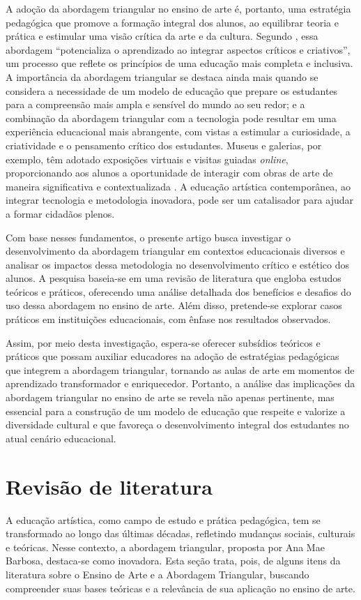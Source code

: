 \documentclass[portuguese]{textolivre}
\begin{document}
A adoção da abordagem triangular no ensino de arte é, portanto, uma estratégia pedagógica que promove a formação integral dos alunos, ao equilibrar teoria e prática e estimular uma visão crítica da arte e da cultura. Segundo \textcite{lopes2013metodologias}, essa abordagem “potencializa o aprendizado ao integrar aspectos críticos e criativos”, um processo que reflete os princípios de uma educação mais completa e inclusiva. A importância da abordagem triangular se destaca ainda mais quando se considera a necessidade de um modelo de educação que prepare os estudantes para a compreensão mais ampla e sensível do mundo ao seu redor; e a combinação da abordagem triangular com a tecnologia pode resultar em uma experiência educacional mais abrangente, com vistas a estimular a curiosidade, a criatividade e o pensamento crítico dos estudantes. Museus e galerias, por exemplo, têm adotado exposições virtuais e visitas guiadas \textit{online}, proporcionando aos alunos a oportunidade de interagir com obras de arte de maneira significativa e contextualizada \cite{barbosa2010arte}. A educação artística contemporânea, ao integrar tecnologia e metodologia inovadora, pode ser um catalisador para ajudar a formar cidadãos plenos.

Com base nesses fundamentos, o presente artigo busca investigar o desenvolvimento da abordagem triangular em contextos educacionais diversos e analisar os impactos dessa metodologia no desenvolvimento crítico e estético dos alunos. A pesquisa baseia-se em uma revisão de literatura que engloba estudos teóricos e práticos, oferecendo uma análise detalhada dos benefícios e desafios do uso dessa abordagem no ensino de arte. Além disso, pretende-se explorar casos práticos em instituições educacionais, com ênfase nos resultados observados.

Assim, por meio desta investigação, espera-se oferecer subsídios teóricos e práticos que possam auxiliar educadores na adoção de estratégias pedagógicas que integrem a abordagem triangular, tornando as aulas de arte em momentos de aprendizado transformador e enriquecedor. Portanto, a análise das implicações da abordagem triangular no ensino de arte se revela não apenas pertinente, mas essencial para a construção de um modelo de educação que respeite e valorize a diversidade cultural e que favoreça o desenvolvimento integral dos estudantes no atual cenário educacional.

\section{Revisão de literatura}\label{sec-normas}
A educação artística, como campo de estudo e prática pedagógica, tem se transformado ao longo das últimas décadas, refletindo mudanças sociais, culturais e teóricas. Nesse contexto, a abordagem triangular, proposta por Ana Mae Barbosa, destaca-se como inovadora. Esta seção trata, pois, de alguns itens da literatura sobre o Ensino de Arte e a Abordagem Triangular, buscando compreender suas bases teóricas e a relevância de sua aplicação no ensino de arte.
\end{document}
